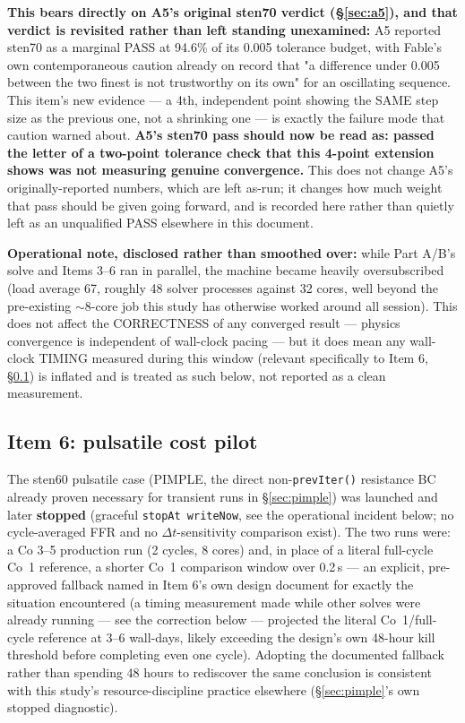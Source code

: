 \documentclass[11pt]{article}
\begin{document}
\textbf{This bears directly on A5's original sten70 verdict (\S\ref{sec:a5}), and that verdict is
revisited rather than left standing unexamined:} A5 reported sten70 as a marginal PASS at 94.6\% of its
0.005 tolerance budget, with Fable's own contemporaneous caution already on record that "a difference
under 0.005 between the two finest is not trustworthy on its own" for an oscillating sequence. This
item's new evidence --- a 4th, independent point showing the SAME step size as the previous one, not a
shrinking one --- is exactly the failure mode that caution warned about. \textbf{A5's sten70 pass should
now be read as: passed the letter of a two-point tolerance check that this 4-point extension shows was
not measuring genuine convergence.} This does not change A5's originally-reported numbers, which are
left as-run; it changes how much weight that pass should be given going forward, and is recorded here
rather than quietly left as an unqualified PASS elsewhere in this document.

\textbf{Operational note, disclosed rather than smoothed over:} while Part A/B's solve and Items 3--6
ran in parallel, the machine became heavily oversubscribed (load average 67, roughly 48 solver
processes against 32 cores, well beyond the pre-existing $\sim$8-core job this study has otherwise
worked around all session). This does not affect the CORRECTNESS of any converged result --- physics
convergence is independent of wall-clock pacing --- but it does mean any wall-clock TIMING measured
during this window (relevant specifically to Item 6, \S\ref{sec:item6}) is inflated and is treated as
such below, not reported as a clean measurement.

\subsection{Item 6: pulsatile cost pilot}
\label{sec:item6}
The sten60 pulsatile case (PIMPLE, the direct non-\texttt{prevIter()} resistance BC already proven
necessary for transient runs in \S\ref{sec:pimple}) was launched and later \textbf{stopped} (graceful \texttt{stopAt writeNow}, see the operational incident below; no cycle-averaged FFR and no $\Delta t$-sensitivity comparison exist). The two runs were: a Co 3--5 production run (2 cycles,
8 cores) and, in place of a literal full-cycle Co~1 reference, a shorter Co~1 comparison window over
0.2\,s --- an explicit, pre-approved fallback named in Item 6's own design document for exactly the
situation encountered (a timing measurement made while other solves were already running --- see the correction below --- projected the literal Co~1/full-
cycle reference at 3--6 wall-days, likely exceeding the design's own 48-hour kill threshold before
completing even one cycle). Adopting the documented fallback rather than spending 48 hours to
rediscover the same conclusion is consistent with this study's resource-discipline practice elsewhere
(\S\ref{sec:pimple}'s own stopped diagnostic).
\end{document}
